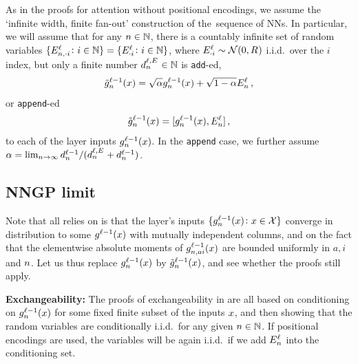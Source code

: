 As in the proofs for attention without positional encodings, we assume the `infinite width, finite fan-out' construction of the~sequence of NNs.
In particular, we will assume that for any $n \in \mathbb{N}$, there is a countably infinite set of random variables $\{ E_{n, \cdot i}^{\ell} \colon i \in \mathbb{N} \} = \{ E_{\cdot i}^{\ell} \colon i \in \mathbb{N} \}$, where $E_{\cdot i}^{\ell} \sim \mathcal{N} ( 0 , R_{}^{} )$ i.i.d.\ over the $i$ index, but only a finite number $d_{n}^{\ell, E_{}^{}} \in \mathbb{N}$ is \texttt{add}-ed, 
$$
    {\tilde{g}}^{\ell - 1}_{n}{(x)} = \sqrt{\alpha}
    g_{n}^{\ell - 1}(x) + \sqrt{1 - \alpha}
    E_{n}^{\ell}
    \, ,
$$
or \texttt{append}-ed
$$
    {\tilde{g}}^{\ell - 1}_{n}{(x)} = [ g_{n}^{\ell - 1}(x) , E_{n}^{\ell}]
    \, ,
$$
to each of the layer inputs ${g}^{\ell - 1}_{n}{(x)}$.
In the \texttt{append} case, we further assume $\alpha = \lim_{n \to \infty} d_{n}^{\ell - 1} / (d_{n}^{\ell, E_{}^{}} + d_{n}^{\ell - 1})$.


\subsection{NNGP limit}

Note that all  relies on is that the layer's inputs $\{ {g}^{\ell - 1}_{n}{(x)}  \colon x \in \mathcal{X} \}$ converge in distribution to some ${g}^{\ell - 1}_{}{(x)}$ with mutually independent columns, and on the fact that the elementwise absolute moments of ${g}^{\ell - 1}_{n, a i}{(x)}$ are bounded uniformly in $a, i$ and $n$.
Let us thus replace $g_{n}^{\ell - 1}(x)$ by ${\tilde{g}}^{\ell - 1}_{n}{(x)}$, and see whether the proofs still apply.

\textbf{Exchangeability:} 
The proofs of exchangeability in  are all based on conditioning on ${g}^{\ell - 1}_{n}{(x)}$ for some fixed finite subset of the inputs $x$, and then showing that the random variables are conditionally i.i.d.\ for any given $n \in \mathbb{N}$.
If positional encodings are used, the variables will be again i.i.d.\ if we add $E_{n}^{\ell}$ into the conditioning set.


